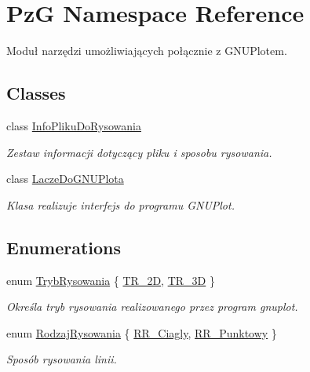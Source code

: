 \hypertarget{namespace_pz_g}{}\section{PzG Namespace Reference}
\label{namespace_pz_g}


Moduł narzędzi umożliwiających połącznie z G\+N\+U\+Plotem.  


\subsection*{Classes}
\begin{DoxyCompactItemize}
\item 
class \hyperlink{class_pz_g_1_1_info_pliku_do_rysowania}{Info\+Pliku\+Do\+Rysowania}
\begin{DoxyCompactList}\small\item\em Zestaw informacji dotyczący pliku i sposobu rysowania. \end{DoxyCompactList}\item 
class \hyperlink{class_pz_g_1_1_lacze_do_g_n_u_plota}{Lacze\+Do\+G\+N\+U\+Plota}
\begin{DoxyCompactList}\small\item\em Klasa realizuje interfejs do programu G\+N\+U\+Plot. \end{DoxyCompactList}\end{DoxyCompactItemize}
\subsection*{Enumerations}
\begin{DoxyCompactItemize}
\item 
enum \hyperlink{namespace_pz_g_aeedae1ef10c66d720f9e89de408ca4ca}{Tryb\+Rysowania} \{ \hyperlink{namespace_pz_g_aeedae1ef10c66d720f9e89de408ca4caa5eb0cf8b3405e136f092efdb489d60c4}{T\+R\+\_\+2D}, 
\hyperlink{namespace_pz_g_aeedae1ef10c66d720f9e89de408ca4caa856e6b0fa6b8a9dc184c60cf27dcc5d2}{T\+R\+\_\+3D}
 \}\begin{DoxyCompactList}\small\item\em Określa tryb rysowania realizowanego przez program {\ttfamily gnuplot}. \end{DoxyCompactList}
\item 
enum \hyperlink{namespace_pz_g_a705c92106f39b7d0c34a6739d10ff0b6}{Rodzaj\+Rysowania} \{ \hyperlink{namespace_pz_g_a705c92106f39b7d0c34a6739d10ff0b6a927eaa159aa4bd3198f0a330b967746d}{R\+R\+\_\+\+Ciagly}, 
\hyperlink{namespace_pz_g_a705c92106f39b7d0c34a6739d10ff0b6aa01097ee8266d6402b752ef6f9a4690c}{R\+R\+\_\+\+Punktowy}
 \}\begin{DoxyCompactList}\small\item\em Sposób rysowania linii. \end{DoxyCompactList}
\end{DoxyCompactItemize}
